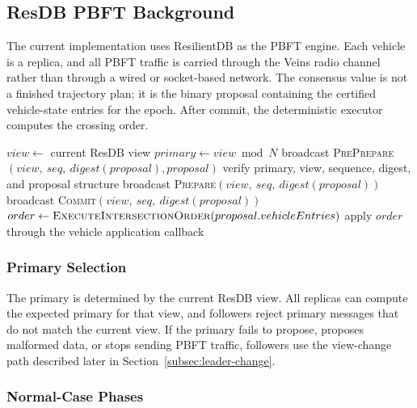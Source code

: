 \documentclass[fleqn,10pt]{olplainarticle}
\begin{document}
\subsection{ResDB PBFT Background}

The current implementation uses ResilientDB as the PBFT engine. Each vehicle is a replica, and all PBFT traffic is carried through the Veins radio channel rather than through a wired or socket-based network. The consensus value is not a finished trajectory plan; it is the binary proposal containing the certified vehicle-state entries for the epoch. After commit, the deterministic executor computes the crossing order.

\begin{algorithm}[H]
\caption{\textsc{ResDBPBFTConsensus}$(proposal)$}
\begin{algorithmic}[1]
\State $view \gets$ current ResDB view
\State $primary \gets view \bmod N$
    \State broadcast \textsc{PrePrepare}$(view,\ seq,\ digest(proposal), proposal)$
\EndIf
{}
    \State verify primary, view, sequence, digest, and proposal structure
    \State broadcast \textsc{Prepare}$(view,\ seq,\ digest(proposal))$
\EndFor
{}
    \State broadcast \textsc{Commit}$(view,\ seq,\ digest(proposal))$
\EndFor
{}
    \State $order \gets \textsc{ExecuteIntersectionOrder}(proposal.vehicleEntries)$
    \State apply $order$ through the vehicle application callback
\EndFor
\end{algorithmic}
\end{algorithm}

\subsubsection{Primary Selection}

The primary is determined by the current ResDB view. All replicas can compute the expected primary for that view, and followers reject primary messages that do not match the current view. If the primary fails to propose, proposes malformed data, or stops sending PBFT traffic, followers use the view-change path described later in Section~\ref{subsec:leader-change}.

\subsubsection{Normal-Case Phases}
\end{document}
